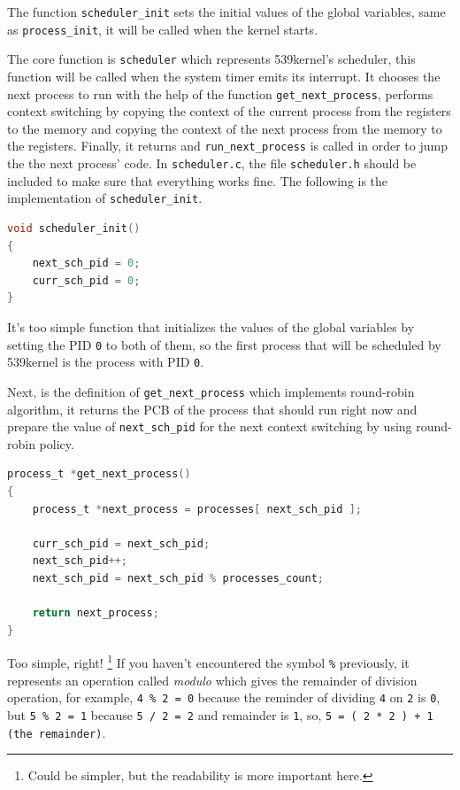 The function \lstinline!scheduler_init! sets the initial values of the
global variables, same as \lstinline!process_init!, it will be called
when the kernel starts.

The core function is \lstinline!scheduler! which represents 539kernel's
scheduler, this function will be called when the system timer emits its
interrupt. It chooses the next process to run with the help of the
function \lstinline!get_next_process!, performs context switching by
copying the context of the current process from the registers to the
memory and copying the context of the next process from the memory to
the registers. Finally, it returns and \lstinline!run_next_process! is
called in order to jump the the next process' code. In
\lstinline!scheduler.c!, the file \lstinline!scheduler.h! should be
included to make sure that everything works fine. The following is the
implementation of \lstinline!scheduler_init!.

\begin{lstlisting}[language=C]
void scheduler_init()
{
    next_sch_pid = 0;
    curr_sch_pid = 0;
}
\end{lstlisting}

It's too simple function that initializes the values of the global
variables by setting the PID \lstinline!0! to both of them, so the first
process that will be scheduled by 539kernel is the process with PID
\lstinline!0!.

Next, is the definition of \lstinline!get_next_process! which implements
round-robin algorithm, it returns the PCB of the process that should run
right now and prepare the value of \lstinline!next_sch_pid! for the next
context switching by using round-robin policy.

\begin{lstlisting}[language=C]
process_t *get_next_process()
{
    process_t *next_process = processes[ next_sch_pid ];
    
    curr_sch_pid = next_sch_pid;
    next_sch_pid++;
    next_sch_pid = next_sch_pid % processes_count;
    
    return next_process;
}
\end{lstlisting}

Too simple, right! \footnote{Could be simpler, but the readability is
  more important here.} If you haven't encountered the symbol
\lstinline!%! previously, it represents an operation called
\emph{modulo} which gives the remainder of division operation, for
example, \lstinline!4 % 2 = 0! because the reminder of dividing
\lstinline!4! on \lstinline!2! is \lstinline!0!, but
\lstinline!5 % 2 = 1! because \lstinline!5 / 2 = 2! and remainder is
\lstinline!1!, so, \lstinline!5 = ( 2 * 2 ) + 1 (the remainder)!.

